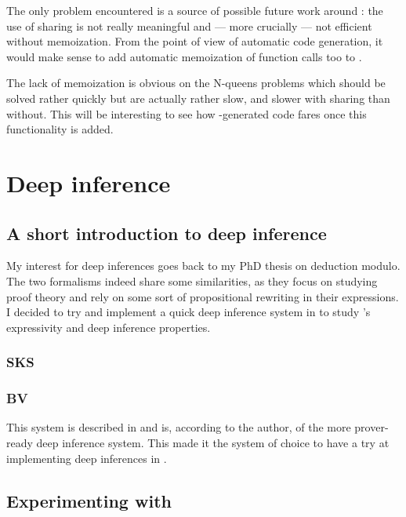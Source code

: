 The only problem encountered is a source of possible future work
around \moca : the use of sharing is not really meaningful and --- more
crucially --- not efficient without memoization. From the point of
view of automatic code generation, it would make sense to add
automatic memoization of function calls too to \moca.

The lack of memoization is obvious on the N-queens problems which
should be solved rather quickly but are actually rather slow, and
slower with sharing than without. This will be interesting to see how
\moca-generated code fares once this functionality is added.

\section{Deep inference}
\label{sec:deepinf}

\subsection{A short introduction to deep inference}
\label{sec:di}

My interest for deep inferences goes back to my PhD thesis on
deduction modulo. The two formalisms indeed share some similarities,
as they focus on studying proof theory and rely on some sort of
propositional rewriting in their expressions. I decided to try and
implement a quick deep inference system in \moca to study \moca's
expressivity and deep inference properties.

\subsubsection{SKS}

\subsubsection{BV}
\label{sec:bv}

This system is described in \cite{OKah06} and is, according to the
author, of the more prover-ready deep inference system.  This made it
the system of choice to have a try at implementing deep inferences in \moca.

\subsection{Experimenting with \moca}
\label{sec:di_exp}

